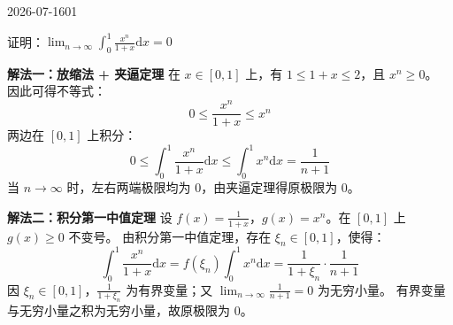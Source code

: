 \begin{mistake}{2026-07-16}{01}

\begin{problemcontent}
证明：\(\lim_{n \to \infty} \int_0^1 \frac{x^n}{1+x} \mathrm{d}x = 0\)
\end{problemcontent}

\begin{solutioncontent}
\textbf{解法一：放缩法 + 夹逼定理}
在 \(x \in [0, 1]\) 上，有 \(1 \le 1+x \le 2\)，且 \(x^n \ge 0\)。
因此可得不等式：
\[ 0 \le \frac{x^n}{1+x} \le x^n \]
两边在 \([0,1]\) 上积分：
\[ 0 \le \int_0^1 \frac{x^n}{1+x} \mathrm{d}x \le \int_0^1 x^n \mathrm{d}x = \frac{1}{n+1} \]
当 \(n \to \infty\) 时，左右两端极限均为 \(0\)，由夹逼定理得原极限为 \(0\)。

\textbf{解法二：积分第一中值定理}
设 \(f(x) = \frac{1}{1+x}\)，\(g(x) = x^n\)。在 \([0,1]\) 上 \(g(x) \ge 0\) 不变号。
由积分第一中值定理，存在 \(\xi_n \in [0, 1]\)，使得：
\[ \int_0^1 \frac{x^n}{1+x} \mathrm{d}x = f(\xi_n) \int_0^1 x^n \mathrm{d}x = \frac{1}{1+\xi_n} \cdot \frac{1}{n+1} \]
因 \(\xi_n \in [0,1]\)，\(\frac{1}{1+\xi_n}\) 为有界变量；又 \(\lim_{n \to \infty} \frac{1}{n+1} = 0\) 为无穷小量。
有界变量与无穷小量之积为无穷小量，故原极限为 \(0\)。
\end{solutioncontent}


\end{mistake}
